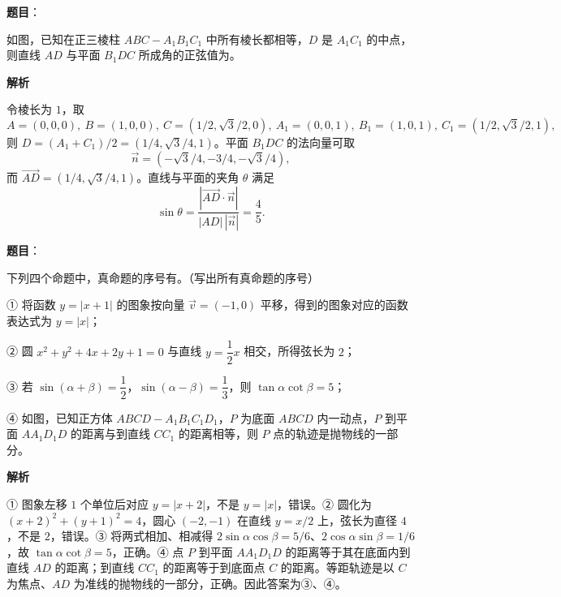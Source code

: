 \begin{answer}

\textbf{题目}：

如图，已知在正三棱柱 $ABC-A_1B_1C_1$ 中所有棱长都相等，$D$ 是 $A_1C_1$ 的中点，则直线 $AD$ 与平面 $B_1DC$ 所成角的正弦值为\gkblank{}。
\nopagebreak[4]
\begin{center}\end{center}
\nopagebreak[4]
\textbf{解析}

令棱长为 $1$，取
\nopagebreak[4]
\[
A=(0,0,0),\ B=(1,0,0),\ C=(1/2,\sqrt3/2,0),\ A_1=(0,0,1),\ B_1=(1,0,1),\ C_1=(1/2,\sqrt3/2,1),
\]
则 $D=(A_1+C_1)/2=(1/4,\sqrt3/4,1)$。平面 $B_1DC$ 的法向量可取
\nopagebreak[4]
\[
\vec n=(-\sqrt3/4,-3/4,-\sqrt3/4),
\]
而 $\overrightarrow{AD}=(1/4,\sqrt3/4,1)$。直线与平面的夹角 $\theta$ 满足
\nopagebreak[4]
\[
\sin\theta=\frac{|\overrightarrow{AD}\cdot\vec n|}{|AD|\,|\vec n|}
=\frac45.
\]


\end{answer}
\begin{answer}

\textbf{题目}：

下列四个命题中，真命题的序号有\gkblank{}。（写出所有真命题的序号）

① 将函数 $y=|x+1|$ 的图象按向量 $\vec v=(-1,0)$ 平移，得到的图象对应的函数表达式为 $y=|x|$；

② 圆 $x^2+y^2+4x+2y+1=0$ 与直线 $y=\dfrac12x$ 相交，所得弦长为 $2$；

③ 若 $\sin(\alpha+\beta)=\dfrac12$，$\sin(\alpha-\beta)=\dfrac13$，则 $\tan\alpha\cot\beta=5$；

④ 如图，已知正方体 $ABCD-A_1B_1C_1D_1$，$P$ 为底面 $ABCD$ 内一动点，$P$ 到平面 $AA_1D_1D$ 的距离与到直线 $CC_1$ 的距离相等，则 $P$ 点的轨迹是抛物线的一部分。
\nopagebreak[4]
\begin{center}\end{center}
\nopagebreak[4]
\textbf{解析}

① 图象左移 $1$ 个单位后对应 $y=|x+2|$，不是 $y=|x|$，错误。② 圆化为 $(x+2)^2+(y+1)^2=4$，圆心 $(-2,-1)$ 在直线 $y=x/2$ 上，弦长为直径 $4$，不是 $2$，错误。③ 将两式相加、相减得 $2\sin\alpha\cos\beta=5/6$、$2\cos\alpha\sin\beta=1/6$，故 $\tan\alpha\cot\beta=5$，正确。④ 点 $P$ 到平面 $AA_1D_1D$ 的距离等于其在底面内到直线 $AD$ 的距离；到直线 $CC_1$ 的距离等于到底面点 $C$ 的距离。等距轨迹是以 $C$ 为焦点、$AD$ 为准线的抛物线的一部分，正确。因此答案为③、④。


\end{answer}
